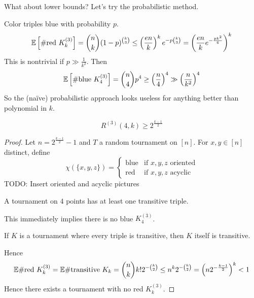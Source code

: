 \documentclass{article}
\begin{document}
What about lower bounds? Let's try the probabilistic method.

Color triples blue with probability $p$.
$$\mathbb E\left[\#\text{red }K_k^{(3)}\right] = \binom nk (1 - p)^{\binom k3} \le \left(\frac{en}k\right)^k e^{-p\binom k3} = \left(\frac{en}k e^{-\frac{pk^2}6}\right)^k$$
This is nontrivial if $p \gg \frac 1{k^2}$. Then
$$\mathbb E\left[\#\text{blue }K_4^{(3)}\right] = \binom n4 p^4 \ge \left(\frac n4\right)^4 \gg \left(\frac n{k^2}\right)^4$$
So the (naïve) probabilistic approach looks useless for anything better than polynomial in $k$.

\newlec

\begin{thm}
  $$R^{(3)}(4, k) \ge 2^{\frac{k - 1}2}$$
\end{thm}
\begin{proof}
  Let $n = 2^{\frac{k - 1}2} - 1$ and $T$ a random tournament on $[n]$. For $x, y \in [n]$ distinct, define
  $$\chi(\{x, y, z\}) =
  \begin{cases}
    \text{blue} & \text{if $x, y, z$ oriented} \\
    \text{red} & \text{if $x, y, z$ acyclic}
  \end{cases}$$
  TODO: Insert oriented and acyclic pictures
  \begin{obs}
    A tournament on $4$ points has at least one transitive triple.
  \end{obs}
  This immediately implies there is no blue $K_4^{(3)}$.
  \begin{obs}
    If $K$ is a tournament where every triple is transitive, then $K$ itself is transitive.
  \end{obs}
  Hence
  $$\mathbb E \#\text{red } K_k^{(3)} = \mathbb E \#\text{transitive } K_k = \binom nk k! 2^{-\binom k2} \le n^k 2^{-\binom k2} = \left(n2^{-\frac{k - 1}2}\right)^k < 1$$
  Hence there exists a tournament with no red $K_k^{(3)}$.
\end{proof}
\end{document}
